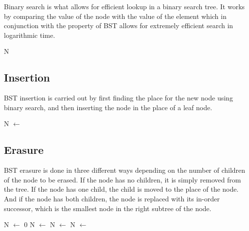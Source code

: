Binary search is what allows for efficient lookup in a binary search tree. It works by comparing the value of the node with the value of the element which in conjunction with the property of BST allows for extremely efficient search in logarithmic time.

\begin{algorithmic}[1]
            \State \Return N
        \EndIf
            \State \Return {}
        \Else
            \State \Return {}
        \EndIf
    \EndFunction
\end{algorithmic}

\subsection{Insertion}

BST insertion is carried out by first finding the place for the new node using binary search, and then inserting the node in the place of a leaf node.

\begin{algorithmic}[1]
            \State N $\gets$ 
            \State {}
        \Else
            \State {}
        \EndIf
    \EndFunction
\end{algorithmic}

\subsection{Erasure}

BST erasure is done in three different ways depending on the number of children of the node to be erased. If the node has no children, it is simply removed from the tree. If the node has one child, the child is moved to the place of the node. And if the node has both children, the node is replaced with its in-order successor, which is the smallest node in the right subtree of the node.

\begin{algorithmic}[1]
            \State \Return
        \EndIf
            \State {}
            \State {}
        \Else
                \State N $\gets$ 0
                \State N $\gets$ 
                \State N $\gets$ 
            \Else
                \State N $\gets$ 
            \EndIf
        \EndIf
    \EndFunction
\end{algorithmic}

